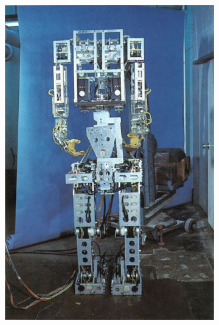 \begin{figure}
  \centering
  \begin{subfigure}[b]{0.4\textwidth}
    \includegraphics[width=\textwidth]{figures/WABOT-1.jpg}
    \caption{}
    \label{fig:wabot-1}
  \end{subfigure}
  \begin{subfigure}[b]{0.4\textwidth}

\end{subfigure}
\end{figure}
